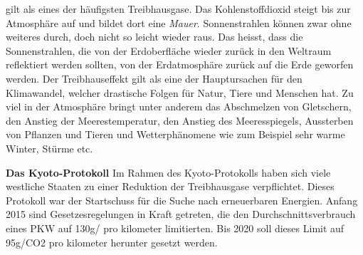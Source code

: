  gilt als eines der häufigsten Treibhausgase.
Das Kohlenstoffdioxid steigt bis zur Atmosphäre auf und bildet dort eine \textit{Mauer}.
Sonnenstrahlen können zwar ohne weiteres durch, doch nicht so leicht wieder raus. Das heisst, dass die Sonnenstrahlen,
die von der Erdoberfläche wieder zurück in den Weltraum reflektiert werden sollten, von der Erdatmosphäre zurück auf die Erde geworfen werden.
Der Treibhauseffekt gilt als eine der Hauptursachen für den Klimawandel, welcher drastische Folgen für Natur, Tiere und Menschen hat. 
Zu viel  in der Atmosphäre bringt unter anderem das Abschmelzen von Gletschern, 
den Anstieg der Meerestemperatur, den Anstieg des Meeresspiegels, 
Aussterben von Pflanzen und Tieren und Wetterphänomene wie zum Beispiel sehr warme Winter, Stürme etc.\nextline
 
\textbf{Das Kyoto-Protokoll\newline}
Im Rahmen des Kyoto-Protokolls haben sich viele westliche Staaten zu einer Reduktion der Treibhausgase verpflichtet. 
Dieses Protokoll war der Startschuss für die Suche nach erneuerbaren Energien. 
Anfang 2015 sind Gesetzesregelungen in Kraft getreten, die den Durchschnittsverbrauch eines PKW auf 130g/ pro kilometer limitierten. 
Bis 2020 soll dieses Limit auf 95g/CO2 pro kilometer herunter gesetzt werden.